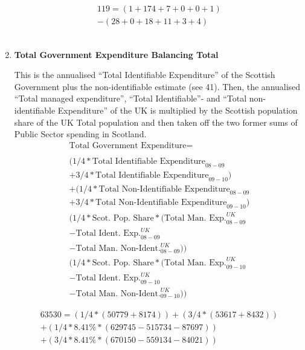\begin{enumerate}
\begin{equation} \nonumber
\begin{split}
119 = (1+174+7+0+0+1)\\
-(28+0+18+11+3+4)
\end{split}
\end{equation}\\


\item \textbf {Total Government Expenditure Balancing Total}

This is the annualised ``Total Identifiable Expenditure'' of the Scottish Government plus the non-identifiable estimate (see 41). Then, the annualised ``Total managed expenditure'', ``Total Identifiable''- and ``Total non-identifiable Expenditure'' of the UK is multiplied by the Scottish population share of the UK Total population and then taken off the two former sums of Public Sector spending in Scotland. \cite{HMTR2012,ONS2011a}\\

\begin{equation}
\begin{split}
\text{Total Government Expenditure} =  \\ \\
(1/4 * \text{Total Identifiable Expenditure}_{08-09} \\
+ 3/4 * \text{Total Identifiable Expenditure}_{09-10})\\
+ (1/4 * \text{Total Non-Identifiable Expenditure}_{08-09} \\
+ 3/4 * \text{Total Non-Identifiable Expenditure}_{09-10}) \\
( 1/4 * \text{Scot. Pop. Share} * ( \text{Total Man. Exp.}^{UK}_{08-09} \\
- \text{Total Ident. Exp.}^{UK}_{08-09} \\
- \text{Total Man. Non-Ident.}^{UK}_{08-09})) \\
( 1/4 * \text{Scot. Pop. Share} * ( \text{Total Man. Exp.}^{UK}_{09-10} \\
- \text{Total Ident. Exp.}^{UK}_{09-10} \\
- \text{Total Man. Non-Ident.}^{UK}_{09-10}))
\end{split} \label{eq:2.5.47}
\end{equation}


\begin{equation} \nonumber
\begin{split}
63530 = (1/4*(50779+8174))+(3/4*(53617+8432))\\
+(1/4*8.41\%*(629745-515734-87697))\\
+(3/4*8.41\%*(670150-559134-84021))
\end{split}
\end{equation}\\



\end{enumerate}
